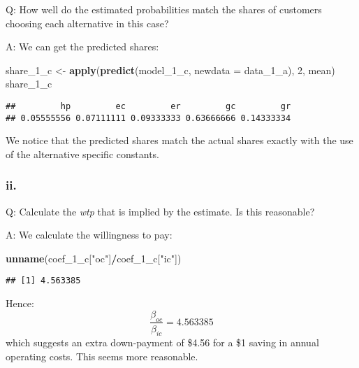 \documentclass[
]{article}
\newenvironment{Shaded}{\begin{snugshade}}{\end{snugshade}}
\newcommand{\DataTypeTok}[1]{\textcolor[rgb]{0.13,0.29,0.53}{#1}}
\newcommand{\DecValTok}[1]{\textcolor[rgb]{0.00,0.00,0.81}{#1}}
\newcommand{\KeywordTok}[1]{\textcolor[rgb]{0.13,0.29,0.53}{\textbf{#1}}}
\newcommand{\NormalTok}[1]{#1}
\newcommand{\OperatorTok}[1]{\textcolor[rgb]{0.81,0.36,0.00}{\textbf{#1}}}
\newcommand{\StringTok}[1]{\textcolor[rgb]{0.31,0.60,0.02}{#1}}
\begin{document}
Q: How well do the estimated probabilities match the shares of customers
choosing each alternative in this case?

A: We can get the predicted shares:

\begin{Shaded}
\begin{Highlighting}[]
\NormalTok{share_}\DecValTok{1}\NormalTok{_c <-}\StringTok{ }\KeywordTok{apply}\NormalTok{(}\KeywordTok{predict}\NormalTok{(model_}\DecValTok{1}\NormalTok{_c, }\DataTypeTok{newdata =}\NormalTok{ data_}\DecValTok{1}\NormalTok{_a), }\DecValTok{2}\NormalTok{, mean)}
\NormalTok{share_}\DecValTok{1}\NormalTok{_c}
\end{Highlighting}
\end{Shaded}

\begin{verbatim}
##         hp         ec         er         gc         gr 
## 0.05555556 0.07111111 0.09333333 0.63666666 0.14333334
\end{verbatim}

We notice that the predicted shares match the actual shares exactly with
the use of the alternative specific constants.

\hypertarget{ii.-1}{%
\subsubsection{ii.}\label{ii.-1}}

Q: Calculate the \emph{wtp} that is implied by the estimate. Is this
reasonable?

A: We calculate the willingness to pay:

\begin{Shaded}
\begin{Highlighting}[]
\KeywordTok{unname}\NormalTok{(coef_}\DecValTok{1}\NormalTok{_c[}\StringTok{"oc"}\NormalTok{]}\OperatorTok{/}\NormalTok{coef_}\DecValTok{1}\NormalTok{_c[}\StringTok{"ic"}\NormalTok{])}
\end{Highlighting}
\end{Shaded}

\begin{verbatim}
## [1] 4.563385
\end{verbatim}

Hence: \begin{equation*}
\frac{\beta_{oc}}{\beta_{ic}}=4.563385
\end{equation*} which suggests an extra down-payment of \$4.56 for a \$1
saving in annual operating costs. This seems more reasonable.
\end{document}
